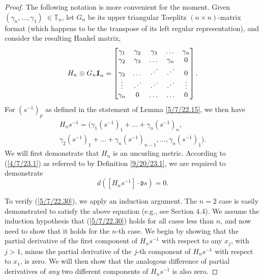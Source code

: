 \documentclass{amsart}
\numberwithin{equation}{section}
\theoremstyle{definition}
\numberwithin{theorem}{section}
\begin{document}
\begin{proof} The following notation is more convenient for the moment.  Given $(\gamma_n,\dots,\gamma_1)$ $\in \mathbb{T}_n$, let $G_n$ be its upper triangular Toeplitz $(n\times n)$-matrix format (which happens to be the transpose of its left regular representation), and consider the resulting Hankel matrix, 
\begin{equation}\label{5/7/22.20} H_n \equiv G_n \slashed{\bf 1}_n = \begin{bmatrix} \gamma_1 & \gamma_2 & \gamma_3 & \dots & \gamma_n \\ \gamma_2 & \gamma_3 & \dots & \gamma_n & 0 \\ \gamma_3 & \dots & \iddots & \iddots & 0  \\ \vdots & \iddots & \iddots & \iddots & \vdots \\ \gamma_n & 0 & \dots & \ldots & 0 \end{bmatrix}.\end{equation}
For $\left( s^{-1} \right)_p$ as defined in the statement of Lemma \ref{5/7/22.15}, we then have
\begin{multline}  H_n s^{-1}   =  \Big( \gamma_1\left( s^{-1} \right)_1  + \dots + \gamma_n \left( s^{-1} \right)_n, \\ \gamma_2\left( s^{-1} \right)_1  + \dots + \gamma_n \left( s^{-1} \right)_{n-1}, 
  \dots , 
 \gamma_n \left( s^{-1} \right)_1 \Big). \label{5/7/22.40}
\end{multline}
 We will first demonstrate that $H_n$ is an uncurling metric.  According to (\ref{4/7/23.1}) as referred to by Definition \ref{9/20/23.1}, we are required to demonstrate 
\begin{equation}\label{5/7/22.30} d\left([H_n s^{-1}]\cdot \mathfrak{d}s\right) = 0.\end{equation}  

To verify (\ref{5/7/22.30}), we apply an induction argument.  The $n=2$ case is easily demonstrated to satisfy the above equation (e.g., see Section 4.4).  We assume the induction hypothesis that (\ref{5/7/22.30}) holds for all cases less than $n$, and now need to show that it holds for the $n$-th case.  
We begin by showing that the partial derivative of the first component of $H_n s^{-1}$ with respect to any $x_j$, with $j>1$, minus the partial derivative of the $j$-th component of $H_n s^{-1}$ with respect to $x_1$, is zero. We will then show that the analogous difference of partial derivatives of {\it any} two different components of $H_ns^{-1}$ is also zero.


\end{proof}
\end{document}
